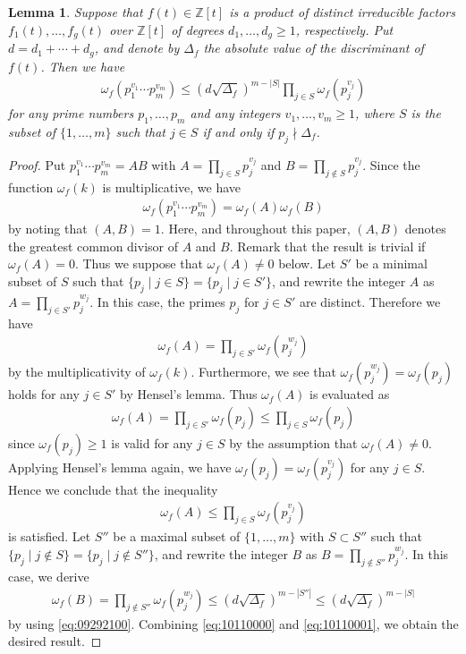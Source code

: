\documentclass[a4paper,11pt]{amsart}
\newtheorem{lemma}[theorem]{Lemma}
\theoremstyle{definition}
\numberwithin{equation}{section}
\begin{document}
\begin{lemma}\label{lem:4.2}
Suppose that $f(t) \in \mathbb{Z}[t]$ is a product of distinct irreducible factors $f_1(t), \ldots, f_g(t)$ over $\mathbb{Z}[t]$ of degrees $d_1, \ldots, d_g \geq1$, respectively. 
Put $d=d_1+\cdots+d_g$, and denote by $\Delta_f$ the absolute value of the discriminant of $f(t)$. 
Then we have
\begin{align*}
\omega_f(p_1^{v_1} \cdots p_m^{v_m})
\leq (d \sqrt{\Delta_f})^{m-|S|} \prod_{j \in S} \omega_f(p_j^{v_j})
\end{align*}
for any prime numbers $p_1,\ldots,p_m$ and any integers $v_1, \ldots, v_m \geq1$, where $S$ is the subset of $\{1,\ldots,m\}$ such that $j \in S$ if and only if $p_j \nmid \Delta_f$. 
\end{lemma}

\begin{proof}
Put $p_1^{v_1} \cdots p_m^{v_m}=AB$ with $A=\prod_{j \in S} p_j^{v_j}$ and $B=\prod_{j \notin S} p_j^{v_j}$. 
Since the function $\omega_f(k)$ is multiplicative, we have 
\begin{align*}
\omega_f(p_1^{v_1} \cdots p_m^{v_m})
= \omega_f(A)\omega_f(B)
\end{align*}
by noting that $(A, B)=1$. 
Here, and throughout this paper, $(A,B)$ denotes the greatest common divisor of $A$ and $B$. 
Remark that the result is trivial if $\omega_f(A)=0$. 
Thus we suppose that $\omega_f(A)\neq0$ below. 
Let $S'$ be a minimal subset of $S$ such that $\{p_j \mid j \in S \}= \{p_j \mid j \in S' \}$, and rewrite the integer $A$ as $A=\prod_{j \in S'} p_j^{w_j}$.  
In this case, the primes $p_j$ for $j \in S'$ are distinct. 
Therefore we have
\begin{align*}
\omega_f(A)
= \prod_{j \in S'} \omega_f(p_j^{w_j})
\end{align*}
by the multiplicativity of $\omega_f(k)$. 
Furthermore, we see that $\omega_f(p_j^{w_j})=\omega_f(p_j)$ holds for any $j \in S'$ by Hensel's lemma. 
Thus $\omega_f(A)$ is evaluated as
\begin{align*}
\omega_f(A)
= \prod_{j \in S'} \omega_f(p_j)
\leq \prod_{j \in S} \omega_f(p_j)
\end{align*}
since $\omega_f(p_j)\geq1$ is valid for any $j \in S$ by the assumption that $\omega_f(A)\neq0$. 
Applying Hensel's lemma again, we have $\omega_f(p_j)=\omega_f(p_j^{v_j})$ for any $j \in S$. 
Hence we conclude that the inequality
\begin{align}\label{eq:10110000}
\omega_f(A)
\leq \prod_{j \in S} \omega_f(p_j^{v_j})
\end{align}
is satisfied. 
Let $S''$ be a maximal subset of $\{1,\ldots,m\}$ with $S \subset S''$ such that $\{p_j \mid j \notin S \}= \{p_j \mid j \notin S'' \}$, and rewrite the integer $B$ as $B=\prod_{j \notin S''} p_j^{w_j}$. 
In this case, we derive
\begin{align}\label{eq:10110001}
\omega_f(B)
= \prod_{j \notin S''} \omega_f(p_j^{w_j})
\leq (d \sqrt{\Delta_f})^{m-|S''|} 
\leq (d \sqrt{\Delta_f})^{m-|S|}
\end{align}
by using \eqref{eq:09292100}. 
Combining \eqref{eq:10110000} and \eqref{eq:10110001},  we obtain the desired result. 
\end{proof}
\end{document}
